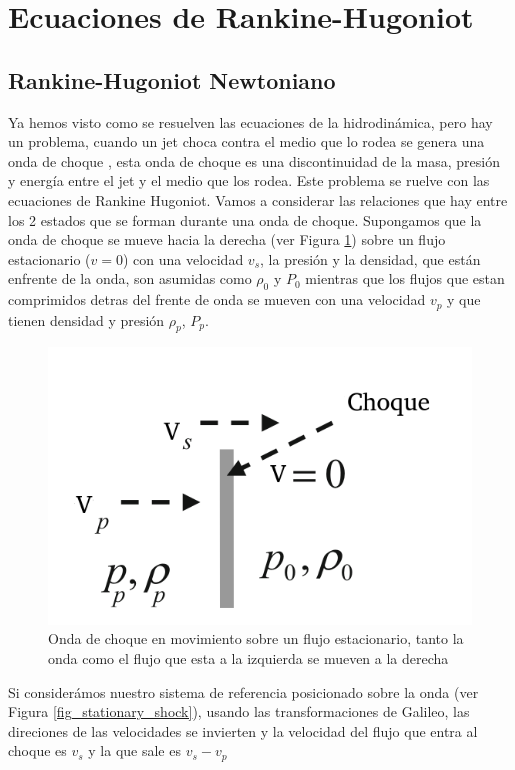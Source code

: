 \documentclass[12pt,a4paper]{book}
\begin{document}
\section{Ecuaciones de Rankine-Hugoniot}

\subsection{Rankine-Hugoniot Newtoniano}

Ya hemos visto como se resuelven las ecuaciones de la hidrodinámica, pero hay un problema, cuando un jet  choca contra el medio que lo rodea se genera una onda de choque
, esta onda de choque es una discontinuidad de la masa, presión y energía entre el jet y el medio que los rodea. Este problema se ruelve con las ecuaciones de 
Rankine Hugoniot.
Vamos a considerar las relaciones que hay entre los 2 estados que se forman durante una onda de choque. Supongamos que la onda de choque se mueve 
hacia la derecha (ver Figura \ref{fig_move_shock}) sobre un flujo estacionario ($v = 0$) con una velocidad $v_s$, la presión y la densidad, que están enfrente de la onda, son asumidas como
$\rho_0$ y $P_0$ mientras que los flujos que estan comprimidos detras del frente de onda se mueven con una velocidad $v_p$ y que tienen
densidad y presión $\rho_p$, $P_p$.

\begin{figure}
  \centering
  \includegraphics[scale=0.7]{./Figuras/Teoria/move_shock.png}
  \caption{Onda de choque en movimiento sobre un flujo estacionario, tanto la onda como el flujo que esta a la izquierda se mueven a la derecha}\label{fig_move_shock}
\end{figure}
  

Si considerámos nuestro sistema de referencia posicionado sobre la onda (ver Figura \ref{fig_stationary_shock}), usando las transformaciones de Galileo, las direciones de las velocidades
se invierten y la velocidad del flujo que entra al choque es $v_s$ y la que sale es $v_s-v_p$
\end{document}
